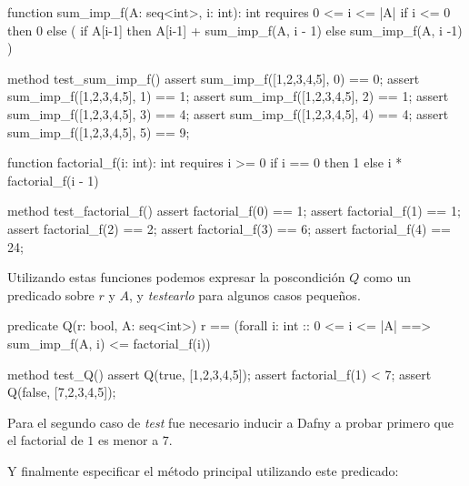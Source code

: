 \documentclass[12pt, a4paper, openany, fleqn]{book}
\begin{document}
    \begin{greenbox}
    \begin{dafny}[gobble=8]
        function sum_imp_f(A: seq<int>, i: int): int
            requires 0 <= i <= |A|
        {
            if i <= 0
                then 0
                else (
                    if A[i-1] %
                        then A[i-1] + sum_imp_f(A, i - 1)
                        else sum_imp_f(A, i -1)
                )
        }

        method test_sum_imp_f()
        {
            assert sum_imp_f([1,2,3,4,5], 0) == 0;
            assert sum_imp_f([1,2,3,4,5], 1) == 1;
            assert sum_imp_f([1,2,3,4,5], 2) == 1;
            assert sum_imp_f([1,2,3,4,5], 3) == 4;
            assert sum_imp_f([1,2,3,4,5], 4) == 4;
            assert sum_imp_f([1,2,3,4,5], 5) == 9;
        }

        function factorial_f(i: int): int
            requires i >= 0
        {
            if i == 0 then 1 else i * factorial_f(i - 1)
        }

        method test_factorial_f() {
            assert factorial_f(0) == 1;
            assert factorial_f(1) == 1;
            assert factorial_f(2) == 2;
            assert factorial_f(3) == 6;
            assert factorial_f(4) == 24;
        }
    \end{dafny}
    \end{greenbox}

    Utilizando estas funciones podemos expresar la poscondición $Q$ como un predicado sobre $r$ y $A$, y \textit{testearlo} para algunos casos pequeños.

    \begin{greenbox}
    \begin{dafny}[gobble=8]
        predicate Q(r: bool, A: seq<int>)
        {
            r == (forall i: int :: 0 <= i <= |A| 
                    ==> sum_imp_f(A, i) <= factorial_f(i))
        }

        method test_Q(){
            assert Q(true, [1,2,3,4,5]);
            assert factorial_f(1) < 7;
            assert Q(false, [7,2,3,4,5]);
        }
    \end{dafny}
    \end{greenbox}

    Para el segundo caso de \textit{test} fue necesario inducir a Dafny a probar primero que el factorial de $1$ es menor a $7$.

    Y finalmente especificar el método principal utilizando este predicado:
\end{document}

